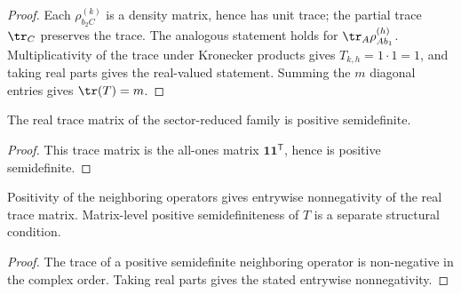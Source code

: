 \begin{proof}
    \leanok
    Each $\rho_{b_2 C}^{(k)}$ is a density matrix, hence has unit trace; the
    partial trace $\tr_C$ preserves the trace. The analogous statement holds
    for $\tr_A \rho_{A b_1}^{(h)}$. Multiplicativity of the trace under
    Kronecker products gives $T_{k,h}=1\cdot 1=1$, and taking real parts
    gives the real-valued statement. Summing the $m$ diagonal entries gives
    $\tr(T)=m$.
\end{proof}

\begin{lemma}
    \label{thm:mpdo_eta_of_hayashi_markov_trace_matrix_psd}
    \leanok
    The real trace matrix of the sector-reduced family is positive
    semidefinite.
\end{lemma}

\begin{proof}
    \leanok
    This trace matrix is the all-ones matrix
    $\mathbf{1}\mathbf{1}^{\mathsf T}$, hence is positive semidefinite.
\end{proof}

\begin{lemma}
    \label{thm:mpdo_explicit_eta_trace_matrix_nonneg}
    \leanok
    Positivity of the neighboring operators gives entrywise nonnegativity of
    the real trace matrix. Matrix-level positive semidefiniteness of $T$ is a
    separate structural condition.
\end{lemma}

\begin{proof}
    \leanok
    The trace of a positive semidefinite neighboring operator is non-negative in
    the complex order. Taking real parts gives the stated entrywise
    nonnegativity.
\end{proof}

